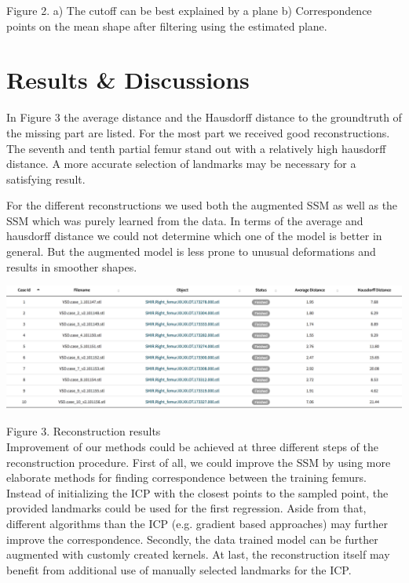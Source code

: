 \documentclass{article}
\begin{document}
	Figure 2. a) The cutoff can be best explained by a plane b) Correspondence points on the mean shape after filtering using the estimated plane. 



	
	\section{Results \& Discussions}
	
	In Figure 3 the average distance and the Hausdorff distance to the groundtruth of the missing part are listed. For the most part we received good reconstructions. The seventh and tenth partial femur stand out with a relatively high hausdorff distance. A more accurate selection of landmarks may be necessary for a satisfying result. 
	
	For the different reconstructions we used both the augmented SSM as well as the SSM which was purely learned from the data. In terms of the average and hausdorff distance we could not determine which one of the model is better in general. But the augmented model is less prone to unusual deformations and results in smoother shapes.
	
	\includegraphics[width=15cm]{3.png}
	
	Figure 3. Reconstruction results\\
	
	Improvement of our methods could be achieved at three different steps of the reconstruction procedure. First of all, we could improve the SSM by using more elaborate methods for finding correspondence between the training femurs. Instead of initializing the ICP with the closest points to the sampled point, the provided landmarks could be used for the first regression. Aside from that, different algorithms than the ICP (e.g. gradient based approaches) may further improve the correspondence. Secondly, the data trained model can be further augmented with customly created kernels. At last, the reconstruction itself may benefit from additional use of manually selected landmarks for the ICP. 
	
\end{document}
